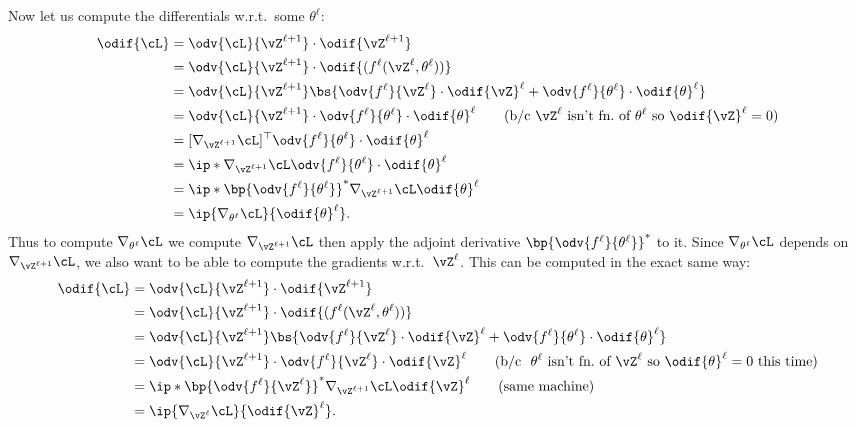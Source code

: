 \documentclass[../../book-main.tex]{subfiles}
\begin{document}
Now let us compute the differentials w.r.t.~some \(\theta^{\ell}\):
\begin{align}
    \odif{\cL}
    &= \odv{\cL}{\vZ^{\ell + 1}}\cdot \odif{\vZ^{\ell + 1}} \\
    &= \odv{\cL}{\vZ^{\ell + 1}}\cdot \odif{{(f^{\ell}(\vZ^{\ell},
    \theta^{\ell}))}} \\
    &= \odv{\cL}{\vZ^{\ell +
    1}}\bs{\odv{f^{\ell}}{\vZ^{\ell}}\cdot\odif{\vZ}^{\ell} +
    \odv{f^{\ell}}{\theta^{\ell}}\cdot\odif{\theta}^{\ell}} \\
    &= \odv{\cL}{\vZ^{\ell + 1}}\cdot
    \odv{f^{\ell}}{\theta^{\ell}}\cdot\odif{\theta}^{\ell} \qquad
    \text{(b/c~\(\vZ^{\ell}\) isn't fn.~of \(\theta^{\ell}\) so
    \(\odif{\vZ}^{\ell} = 0\))} \\
    &= [\nabla_{\vZ^{\ell +
    1}}\cL]^{\top}\odv{f^{\ell}}{\theta^{\ell}}\cdot\odif{\theta}^{\ell} \\
    &= \ip*{\nabla_{\vZ^{\ell +
    1}}\cL}{\odv{f^{\ell}}{\theta^{\ell}}\cdot\odif{\theta}^{\ell}} \\
    &= \ip*{\bp{\odv{f^{\ell}}{\theta^{\ell}}}^{*}\nabla_{\vZ^{\ell +
    1}}\cL}{\odif{\theta}^{\ell}} \\
    &= \ip{\nabla_{\theta^{\ell}}\cL}{\odif{\theta}^{\ell}}.
\end{align}
Thus to compute \(\nabla_{\theta^{\ell}}\cL\) we compute
\(\nabla_{\vZ^{\ell + 1}}\cL\) then apply the adjoint derivative
\(\bp{\odv{f^{\ell}}{\theta^{\ell}}}^{*}\) to it. Since
\(\nabla_{\theta^{\ell}}\cL\) depends on \(\nabla_{\vZ^{\ell +
1}}\cL\), we also want to be able to compute the gradients
w.r.t.~\(\vZ^{\ell}\). This can be computed in the exact same way:
\begin{align}
    \odif{\cL}
    &= \odv{\cL}{\vZ^{\ell + 1}}\cdot \odif{\vZ^{\ell + 1}} \\
    &= \odv{\cL}{\vZ^{\ell + 1}}\cdot\odif{{(f^{\ell}(\vZ^{\ell},
    \theta^{\ell}))}} \\
    &= \odv{\cL}{\vZ^{\ell +
    1}}\bs{\odv{f^{\ell}}{\vZ^{\ell}}\cdot\odif{\vZ}^{\ell} +
    \odv{f^{\ell}}{\theta^{\ell}}\cdot\odif{\theta}^{\ell}} \\
    &= \odv{\cL}{\vZ^{\ell +
    1}}\cdot\odv{f^{\ell}}{\vZ^{\ell}}\cdot\odif{\vZ}^{\ell} \qquad
    \text{(b/c~~\(\theta^{\ell}\) isn't fn.~of \(\vZ^{\ell}\) so
    \(\odif{\theta}^{\ell} = 0\) this time)} \\
    &= \ip*{\bp{\odv{f^{\ell}}{\vZ^{\ell}}}^{*}\nabla_{\vZ^{\ell +
    1}}\cL}{\odif{\vZ}^{\ell}} \qquad \text{(same machine)} \\
    &= \ip{\nabla_{\vZ^{\ell}}\cL}{\odif{\vZ}^{\ell}}.
\end{align}
\end{document}

